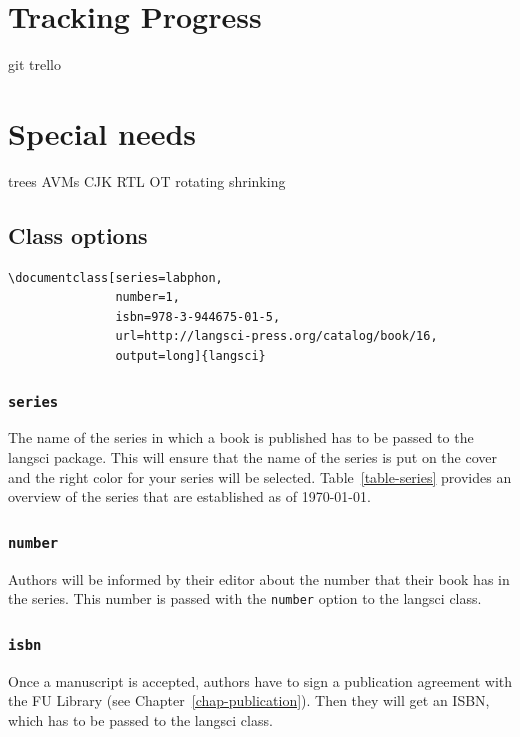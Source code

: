 \section{Tracking Progress}
git
trello

\section{Special needs}
trees
AVMs
CJK
RTL
OT
rotating
shrinking

 
\subsection{Class options}
 

\begin{verbatim}
\documentclass[series=labphon,
               number=1,
               isbn=978-3-944675-01-5,
               url=http://langsci-press.org/catalog/book/16,
               output=long]{langsci}            
\end{verbatim}
 
\subsubsection{\texttt{series}}

The name of the series in which a book is published has to be passed to the langsci package. This will ensure that the name of
the series is put on the cover and the right color for your series will be
selected. Table~\vref{table-series} provides an overview of the series that are established as of
\today.


\subsubsection{\texttt{number}}

Authors will be informed by their editor about the number that their book has in the series. This
number is passed with the \texttt{number} option to the langsci class.

\subsubsection{\texttt{isbn}}

Once a manuscript is accepted, authors have to sign a publication agreement with the FU Library (see
Chapter~\ref{chap-publication}). Then they will get an ISBN, which has to be passed to the langsci class.

